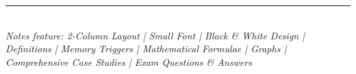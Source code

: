 \documentclass[10pt,a4paper]{article}
\begin{document}
\vspace{1.5cm}
\begin{center}
\rule{0.5\textwidth}{0.5pt}\\[0.5cm]
{\footnotesize \textit{Notes feature: 2-Column Layout | Small Font | Black \& White Design | Definitions | Memory Triggers | Mathematical Formulae | Graphs | Comprehensive Case Studies | Exam Questions \& Answers}}
\end{center}

\newpage


\newpage


\newpage


\newpage


\newpage


\newpage


\newpage


\newpage


\newpage
\end{document}
